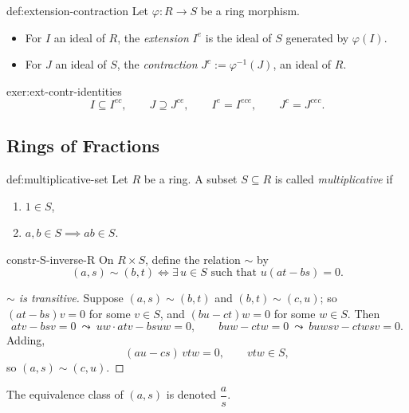\begin{definition}{}{def:extension-contraction}
Let $\varphi: R \to S$ be a ring morphism.
\begin{itemize}
    \item For $I$ an ideal of $R$, the \emph{extension} $I^e$ is the ideal of $S$ generated by $\varphi(I)$.
    \item For $J$ an ideal of $S$, the \emph{contraction} $J^c := \varphi^{-1}(J)$, an ideal of $R$.
\end{itemize}
\end{definition}

\begin{exercise}{}{exer:ext-contr-identities}
\[
I \subseteq I^{ec}, \qquad J \supseteq J^{ce}, \qquad I^e = I^{ece}, \qquad J^c = J^{cec}.
\]
\end{exercise}

\subsection*{Rings of Fractions}

\begin{definition}{}{def:multiplicative-set}
Let $R$ be a ring. A subset $S \subseteq R$ is called \emph{multiplicative} if
\begin{enumerate}[label=(\arabic*)]
    \item $1 \in S$,
    \item $a,b \in S \implies ab \in S$.
\end{enumerate}
\end{definition}

\begin{construction}{}{constr-S-inverse-R}
On $R \times S$, define the relation $\sim$ by
\[
(a,s) \sim (b,t) \iff \exists\, u \in S \text{ such that } u(at-bs) = 0.
\]
\end{construction}

\begin{proof}[$\sim$ is transitive]
Suppose $(a,s)\sim(b,t)$ and $(b,t)\sim(c,u)$; so $(at-bs)v=0$ for some $v \in S$, and $(bu-ct)w=0$ for some $w \in S$. Then
\[
atv - bsv = 0 \ \leadsto\ uw\!\cdot\! atv - bsuw = 0, \qquad buw - ctw = 0 \ \leadsto\ buwsv - ctwsv = 0.
\]
Adding,
\[
(au-cs)\, vtw = 0, \qquad vtw \in S,
\]
so $(a,s) \sim (c,u)$.
\end{proof}

\begin{notation}
The equivalence class of $(a,s)$ is denoted $\dfrac{a}{s}$.
\end{notation}

